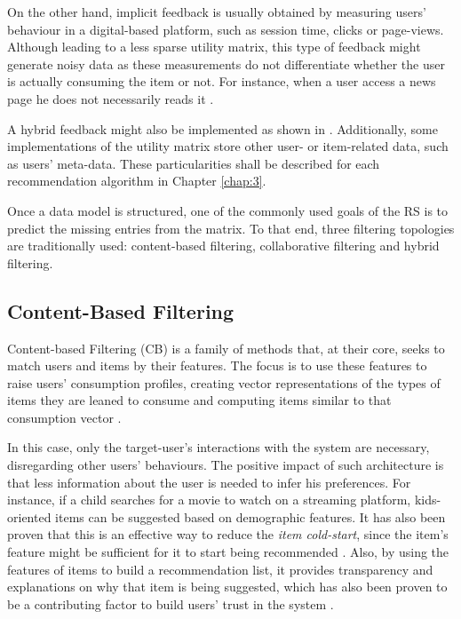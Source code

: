     On the other hand, implicit feedback is usually obtained by measuring users' behaviour in a digital-based platform, such as session time, clicks or page-views. Although leading to a less sparse utility matrix, this type of feedback might generate noisy data as these measurements do not differentiate whether the user is actually consuming the item or not. For instance, when a user access a news page he does not necessarily reads it \cite{2008ImplicitFeedback}.
    
    A hybrid feedback might also be implemented as shown in \cite{2015RSPrinciples}. Additionally, some implementations of the utility matrix store other user- or item-related data, such as users' meta-data. These particularities shall be described for each recommendation algorithm in Chapter \ref{chap:3}. 
    
    Once a data model is structured, one of the commonly used goals of the RS is to predict the missing entries from the matrix. To that end, three filtering topologies are traditionally used: content-based filtering, collaborative filtering and hybrid filtering. 

\subsection{Content-Based Filtering}

    Content-based Filtering (CB)  is a family of methods that, at their core, seeks to match users and items by their features. The focus is to use these features to raise users' consumption profiles, creating vector representations of the types of items they are leaned to consume and computing items similar to that consumption vector \cite{2016Textbook}.
    
    In this case, only the target-user's interactions with the system are necessary, disregarding other users' behaviours. The positive impact of such architecture is that less information about the user is needed to infer his preferences. For instance, if a child searches for a movie to watch on a streaming platform, kids-oriented items can be suggested based on demographic features. It has also been proven that this is an effective way to reduce the \textit{item cold-start}, since the item's feature might be sufficient for it to start being recommended \cite{10.1145/564376.564421}. Also, by using the features of items to build a recommendation list, it provides transparency and explanations on why that item is being suggested, which has also been proven to be a contributing factor to build users' trust in the system \cite{10.1145/1111449.1111475}.

